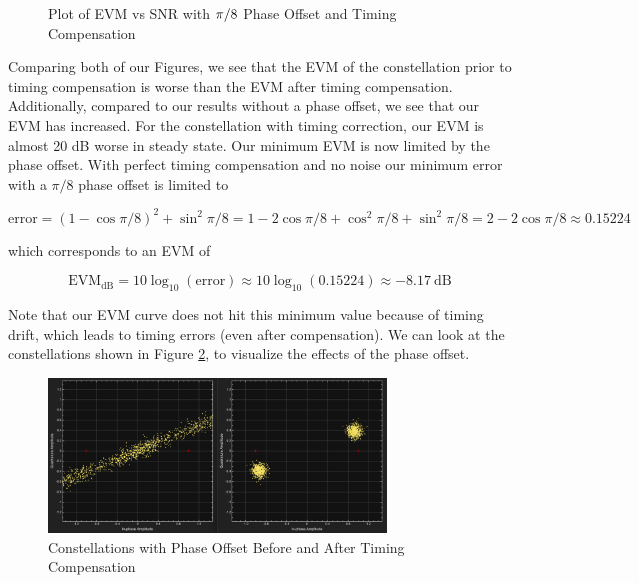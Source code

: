\documentclass{article}
\begin{document}
\begin{figure}[H]
	\centerline{}
	\caption{Plot of EVM vs SNR with $\protect\pi/8$ Phase Offset and Timing Compensation}
	\label{fig::evm_vs_snr_with_phase_offset}
\end{figure}

\noindent Comparing both of our Figures, we see that the EVM of the constellation prior to timing compensation is worse than the EVM after timing compensation. Additionally, compared to our results without a phase offset, we see that our EVM has increased. For the constellation with timing correction, our EVM is almost 20 dB worse in steady state. Our minimum EVM is now limited by the phase offset. With perfect timing compensation and no noise our minimum error with a $\pi/8$ phase offset is limited to

\begin{equation}
	\text{error} = (1 - \cos\pi/8)^2 + \sin^2\pi/8 = 1 - 2\cos\pi/8 + \cos^2\pi/8 + \sin^2\pi/8 = 2 - 2\cos\pi/8 \approx 0.15224 
\end{equation}

\noindent which corresponds to an EVM of 

\begin{equation}
	\text{EVM}_{\text{dB}} = 10\log_{10}\left(\text{error}\right) \approx 10\log_{10}(0.15224) \approx -8.17\ \text{dB}
\end{equation}

\noindent Note that our EVM curve does not hit this minimum value because of timing drift, which leads to timing errors (even after compensation). We can look at the constellations shown in Figure \ref{fig::constellations_with_timing_correction_phase_offset}, to visualize the effects of the phase offset.

\begin{figure}[H]
	\centerline{\includegraphics[width=0.8\textwidth]{constellations_with_timing_correction_phase_offset.png}}
	\caption{Constellations with Phase Offset Before and After Timing Compensation}
	\label{fig::constellations_with_timing_correction_phase_offset}
\end{figure}
\end{document}
